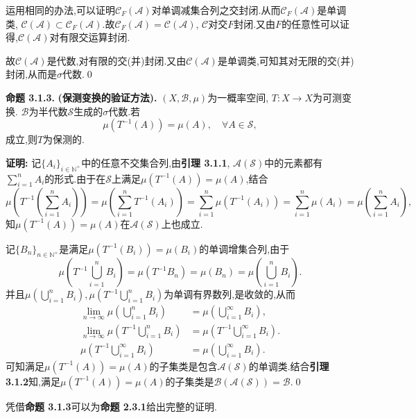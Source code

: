 运用相同的办法,可以证明$\mathcal{C}_F(\mathcal{A})$对单调减集合列之交封闭.从而$\mathcal{C}_F(\mathcal{A})$是单调类, $\mathcal{C}(\mathcal{A})\subset\mathcal{C}_F(\mathcal{A})$.故$\mathcal{C}_F(\mathcal{A})=\mathcal{C}(\mathcal{A})$, $\mathcal{C}$对交$F$封闭.又由$F$的任意性可以证得,$\mathcal{C}(\mathcal{A})$对有限交运算封闭.\par
故$\mathcal{C}(\mathcal{A})$是代数,对有限的交(并)封闭.又由$\mathcal{C}(\mathcal{A})$是单调类,可知其对无限的交(并)封闭,从而是$\sigma$代数.\qed
\par
\textbf{命题 3.1.3.  }\textsuperscript{\cite{Ergodic_Sun,Ergodic_theory}}\textbf{(保测变换的验证方法).  }
$(X,\mathcal{B},\mu)$为一概率空间, $T:X\to X$为可测变换. $\mathcal{B}$为半代数$\mathcal{S}$生成的$\sigma$代数.若
$$\mu(T^{-1}(A))=\mu(A),\quad \forall A\in \mathcal{S},$$
成立,则$T$为保测的.
\par
\textbf{证明:  }
记$\{A_i\}_{i\in\mathbb{N^+}}$中的任意不交集合列,由\textbf{引理 3.1.1}, $\mathcal{A}(\mathcal{S})$中的元素都有$\sum\limits_{i=1}^n A_i$的形式.由于在$\mathcal{S}$上满足$\mu(T^{-1}(A))=\mu(A)$,结合
$$\mu(T^{-1}(\sum\limits_{i=1}^n A_i))=\mu(\sum\limits_{i=1}^n T^{-1}(A_i))=\sum\limits_{i=1}^n\mu(T^{-1}(A_i))=\sum\limits_{i=1}^n\mu(A_i)=\mu(\sum\limits_{i=1}^n A_i),$$
知$\mu(T^{-1}(A))=\mu(A)$在$\mathcal{A}(\mathcal{S})$上也成立.\par
记$\{B_n\}_{n\in\mathbb{N}^+}$是满足$\mu(T^{-1}(B_i))=\mu(B_i)$的单调增集合列,由于
$$\mu\left(T^{-1}\bigcup_{i=1}^{n}B_{i}\right)=\mu\left(T^{-1}B_{n}\right)=
\mu\left(B_{n}\right)=\mu\left(\bigcup_{i=1}^{n}B_{i}\right).$$
并且$\mu\left(\bigcup\limits_{i=1}^{n}B_{i}\right),\mu\left(T^{-1}\bigcup\limits_{i=1}^{n}B_{i}\right)$为单调有界数列,是收敛的,从而
\begin{align*}
    \lim_{n\to\infty}\mu\left(\bigcup\limits_{i=1}^{n}B_{i}\right)&= \mu\left(\bigcup\limits_{i=1}^{\infty}B_{i}\right),\\
    \lim_{n\to\infty}\mu\left(T^{-1}\bigcup\limits_{i=1}^{n}B_{i}\right)&= \mu\left(T^{-1}\bigcup\limits_{i=1}^{\infty}B_{i}\right).\\
    \mu\left(T^{-1}\bigcup_{i=1}^{\infty}B_{i}\right)&=\mu\left(\bigcup_{i=1}^{\infty}B_{i}\right).
\end{align*}
可知满足$\mu(T^{-1}(A))=\mu(A)$的子集类是包含$\mathcal{A}(\mathcal{S})$的单调类.结合\textbf{引理 3.1.2}知,满足$\mu(T^{-1}(A))=\mu(A)$的子集类是$\mathcal{B}(\mathcal{A}(\mathcal{S}))=\mathcal{B}$.\qed
\par
凭借\textbf{命题 3.1.3}可以为\textbf{命题 2.3.1}给出完整的证明.
